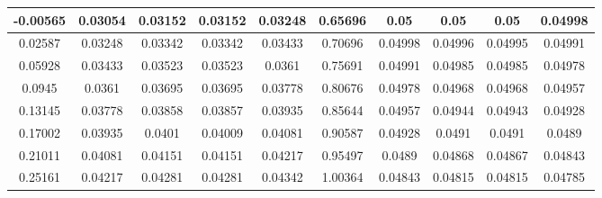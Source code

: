 \begin{table}
\begin{center}
\begin{tabular}{c|c|c|c|c|c|c|c|c|c}
			\hline
			-0.00565 & 0.03054 & 0.03152 & 0.03152 & 0.03248 & 0.65696 & 0.05 & 0.05 & 0.05 & 0.04998 \\
			\hline
			0.02587 & 0.03248 & 0.03342 & 0.03342 & 0.03433 & 0.70696 & 0.04998 & 0.04996 & 0.04995 & 0.04991 \\
			\hline
			0.05928 & 0.03433 & 0.03523 & 0.03523 & 0.0361 & 0.75691 & 0.04991 & 0.04985 & 0.04985 & 0.04978 \\
			\hline
			0.0945 & 0.0361 & 0.03695 & 0.03695 & 0.03778 & 0.80676 & 0.04978 & 0.04968 & 0.04968 & 0.04957 \\
			\hline
			0.13145 & 0.03778 & 0.03858 & 0.03857 & 0.03935 & 0.85644 & 0.04957 & 0.04944 & 0.04943 & 0.04928 \\
			\hline
			0.17002 & 0.03935 & 0.0401 & 0.04009 & 0.04081 & 0.90587 & 0.04928 & 0.0491 & 0.0491 & 0.0489 \\
			\hline
			0.21011 & 0.04081 & 0.04151 & 0.04151 & 0.04217 & 0.95497 & 0.0489 & 0.04868 & 0.04867 & 0.04843 \\
			\hline
			0.25161 & 0.04217 & 0.04281 & 0.04281 & 0.04342 & 1.00364 & 0.04843 & 0.04815 & 0.04815 & 0.04785 \\
		\end{tabular}
	\end{center}
\end{table}